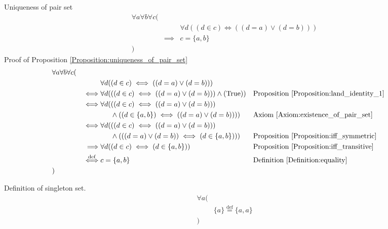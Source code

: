 \begin{prop}
\label{Proposition:uniqueness_of_pair_set}
Uniqueness of pair set
\begin{align*}
& \forall a \forall b \forall c ( \\
& & & \forall d ((d \in c) \iff ((d = a) \lor (d = b))) \\
& & \implies & c = \{ a , b \} \\
& )
\end{align*}
Proof of Proposition \ref{Proposition:uniqueness_of_pair_set}
\begin{align*}
& \forall a \forall b \forall c ( \\
& & & \forall d ((d \in c) \iff ((d = a) \lor (d = b))) \\
& & \iff & \forall d (((d \in c) \iff ((d = a) \lor (d = b))) \land (\text{True}))
& & \text{Proposition \ref{Proposition:land_identity_1}} \\
& & \iff & \forall d (((d \in c) \iff ((d = a) \lor (d = b))) \\
& & & \phantom{\forall d (} \land ((d \in \{ a , b \}) \iff ((d = a) \lor (d = b))))
& & \text{Axiom \ref{Axiom:existence_of_pair_set}} \\
& & \iff & \forall d (((d \in c) \iff ((d = a) \lor (d = b))) \\
& & & \phantom{\forall d (} \land (((d = a) \lor (d = b)) \iff (d \in \{ a , b \})))
& & \text{Proposition \ref{Proposition:iff_symmetric}} \\
& & \implies & \forall d ((d \in c) \iff (d \in \{ a , b \}))
& & \text{Proposition \ref{Proposition:iff_transitive}} \\
& & \overset{\operatorname{def}}{\iff} & c = \{ a , b \}
& & \text{Definition \ref{Definition:equality}} \\
& )
\end{align*}
\end{prop}

\begin{defn}
\label{Definition:singleton_set}
Definition of singleton set.
\begin{align*}
& \forall a ( \\
& & \{ a \} \overset{\operatorname{def}}{=} \{ a , a \} \\
& )
\end{align*}
\end{defn}

